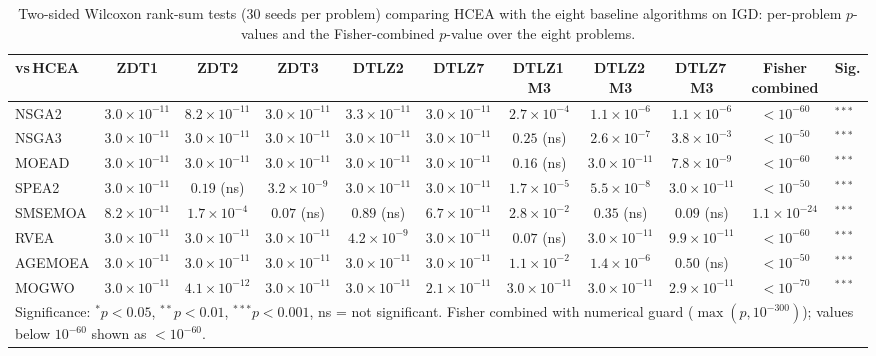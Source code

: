 \begin{table}[t]
\centering
\caption{Two-sided Wilcoxon rank-sum tests (30 seeds per problem) comparing HCEA with the eight baseline algorithms on IGD: per-problem $p$-values and the Fisher-combined $p$-value over the eight problems.}
\label{tab:wilcoxon_igd}
\footnotesize
\setlength{\tabcolsep}{3pt}
\begin{tabular}{lcccccccc|cl}
\toprule
vs\,HCEA & ZDT1 & ZDT2 & ZDT3 & DTLZ2 & DTLZ7 & DTLZ1\,M3 & DTLZ2\,M3 & DTLZ7\,M3 & Fisher combined & Sig.\\
\midrule
NSGA2 & $3.0\times10^{-11}$ & $8.2\times10^{-11}$ & $3.0\times10^{-11}$ & $3.3\times10^{-11}$ & $3.0\times10^{-11}$ & $2.7\times10^{-4}$ & $1.1\times10^{-6}$ & $1.1\times10^{-6}$ & $<10^{-60}$ & $^{***}$ \\
NSGA3 & $3.0\times10^{-11}$ & $3.0\times10^{-11}$ & $3.0\times10^{-11}$ & $3.0\times10^{-11}$ & $3.0\times10^{-11}$ & $0.25$ (ns) & $2.6\times10^{-7}$ & $3.8\times10^{-3}$ & $<10^{-50}$ & $^{***}$ \\
MOEAD & $3.0\times10^{-11}$ & $3.0\times10^{-11}$ & $3.0\times10^{-11}$ & $3.0\times10^{-11}$ & $3.0\times10^{-11}$ & $0.16$ (ns) & $3.0\times10^{-11}$ & $7.8\times10^{-9}$ & $<10^{-60}$ & $^{***}$ \\
SPEA2 & $3.0\times10^{-11}$ & $0.19$ (ns) & $3.2\times10^{-9}$ & $3.0\times10^{-11}$ & $3.0\times10^{-11}$ & $1.7\times10^{-5}$ & $5.5\times10^{-8}$ & $3.0\times10^{-11}$ & $<10^{-50}$ & $^{***}$ \\
SMSEMOA & $8.2\times10^{-11}$ & $1.7\times10^{-4}$ & $0.07$ (ns) & $0.89$ (ns) & $6.7\times10^{-11}$ & $2.8\times10^{-2}$ & $0.35$ (ns) & $0.09$ (ns) & $1.1\times10^{-24}$ & $^{***}$ \\
RVEA & $3.0\times10^{-11}$ & $3.0\times10^{-11}$ & $3.0\times10^{-11}$ & $4.2\times10^{-9}$ & $3.0\times10^{-11}$ & $0.07$ (ns) & $3.0\times10^{-11}$ & $9.9\times10^{-11}$ & $<10^{-60}$ & $^{***}$ \\
AGEMOEA & $3.0\times10^{-11}$ & $3.0\times10^{-11}$ & $3.0\times10^{-11}$ & $3.0\times10^{-11}$ & $3.0\times10^{-11}$ & $1.1\times10^{-2}$ & $1.4\times10^{-6}$ & $0.50$ (ns) & $<10^{-50}$ & $^{***}$ \\
MOGWO & $3.0\times10^{-11}$ & $4.1\times10^{-12}$ & $3.0\times10^{-11}$ & $3.0\times10^{-11}$ & $2.1\times10^{-11}$ & $3.0\times10^{-11}$ & $3.0\times10^{-11}$ & $2.9\times10^{-11}$ & $<10^{-70}$ & $^{***}$ \\
\midrule
\multicolumn{11}{l}{\footnotesize Significance: $^{*}p<0.05$, $^{**}p<0.01$, $^{***}p<0.001$, ns = not significant. Fisher combined with numerical guard ($\max(p,10^{-300})$); values below $10^{-60}$ shown as $<10^{-60}$.}\\
\bottomrule
\end{tabular}
\end{table}
